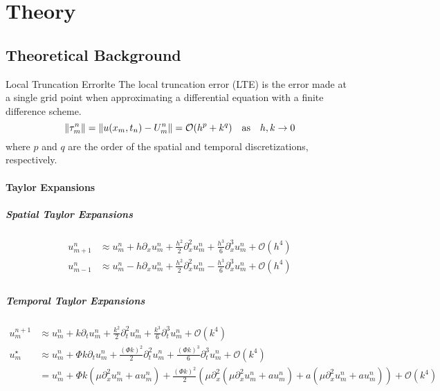 \section{Theory}

\subsection{Theoretical Background}

\begin{definition}{Local Truncation Error}{lte}
  The local truncation error (LTE) is the error made at a single grid point when approximating a differential equation with a finite difference scheme.
  \[
    \lVert\tau_m^n\rVert = \lVert u(x_m, t_n) - U_m^n\rVert = \mathcal{O}(h^p + k^q) \quad \text{as} \quad h, k \to 0
  \]
  where \(p\) and \(q\) are the order of the spatial and temporal discretizations, respectively.
\end{definition}


\paragraph{Taylor Expansions}

\subparagraph{Spatial Taylor Expansions}
\begin{align*}
  u_{m+1}^n & \approx u_m^n + h \partial_x u_m^n + \frac{h^2}{2} \partial_x^2 u_m^n + \frac{h^3}{6} \partial_x^3 u_m^n + \mathcal{O}(h^4) \\
  u_{m-1}^n & \approx u_m^n - h \partial_x u_m^n + \frac{h^2}{2} \partial_x^2 u_m^n - \frac{h^3}{6} \partial_x^3 u_m^n + \mathcal{O}(h^4) \\
\end{align*}

\subparagraph{Temporal Taylor Expansions}
\begin{align*}
  u_m^{n+1} & \approx u_m^n + k \partial_t u_m^n + \frac{k^2}{2} \partial_t^2 u_m^n + \frac{k^3}{6} \partial_t^3 u_m^n + \mathcal{O}(k^4)                                                                                                            \\
  u_m^\star & \approx u_m^n + \Phi k \partial_t u_m^n + \frac{(\Phi k)^2}{2} \partial_t^2 u_m^n + \frac{(\Phi k)^3}{6} \partial_t^3 u_m^n + \mathcal{O}(k^4)                                                                                         \\
            & = u_m^n + \Phi k \left(\mu \partial_x^2 u_m^n + a u_m^n\right) + \frac{(\Phi k)^2}{2} \left(\mu \partial_x^2 \left(\mu \partial_x^2 u_m^n + a u_m^n\right) + a \left(\mu \partial_x^2 u_m^n + a u_m^n\right)\right) + \mathcal{O}(k^4) \\
\end{align*}

